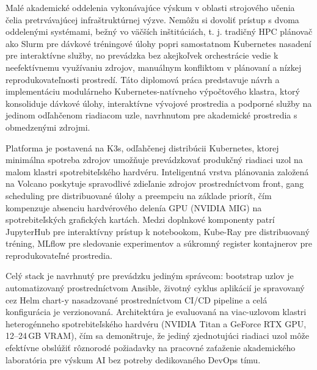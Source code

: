 Malé akademické oddelenia vykonávajúce výskum v oblasti strojového učenia čelia pretrvávajúcej infraštruktúrnej výzve. Nemôžu si dovoliť prístup s dvoma oddelenými systémami, bežný vo väčších inštitúciách, t. j. tradičný HPC plánovač ako Slurm pre dávkové tréningové úlohy popri samostatnom Kubernetes nasadení pre interaktívne služby, no prevádzka bez akejkoľvek orchestrácie vedie k neefektívnemu využívaniu zdrojov, manuálnym konfliktom v plánovaní a nízkej reprodukovateľnosti prostredí. Táto diplomová práca predstavuje návrh a implementáciu modulárneho Kubernetes-natívneho výpočtového klastra, ktorý konsoliduje dávkové úlohy, interaktívne vývojové prostredia a podporné služby na jedinom odľahčenom riadiacom uzle, navrhnutom pre akademické prostredia s obmedzenými zdrojmi.

Platforma je postavená na K3s, odľahčenej distribúcii Kubernetes, ktorej minimálna spotreba zdrojov umožňuje prevádzkovať produkčný riadiaci uzol na malom klastri spotrebiteľského hardvéru. Inteligentná vrstva plánovania založená na Volcano poskytuje spravodlivé zdieľanie zdrojov prostredníctvom front, gang scheduling pre distribuované úlohy a preempciu na základe priorít, čím kompenzuje absenciu hardvérového delenía GPU (NVIDIA MIG) na spotrebiteľských grafických kartách. Medzi doplnkové komponenty patrí JupyterHub pre interaktívny prístup k notebookom, Kube-Ray pre distribuovaný tréning, MLflow pre sledovanie experimentov a súkromný register kontajnerov pre reprodukovateľné prostredia.

Celý stack je navrhnutý pre prevádzku jediným správcom: bootstrap uzlov je automatizovaný prostredníctvom Ansible, životný cyklus aplikácií je spravovaný cez Helm chart-y nasadzované prostredníctvom CI/CD pipeline a celá konfigurácia je verzionovaná. Architektúra je evaluovaná na viac-uzlovom klastri heterogénneho spotrebiteľského hardvéru (NVIDIA Titan a GeForce RTX GPU, 12--24\,GB VRAM), čím sa demonštruje, že jediný zjednotujúci riadiaci uzol môže efektívne obslúžiť rôznorodé požiadavky na pracovné zaťaženie akademického laboratória pre výskum AI bez potreby dedikovaného DevOps tímu.
